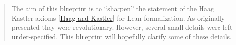 \begin{abstract}
The aim of this blueprint is to ``sharpen'' the statement of the Haag Kastler axioms [\href{https://doi.org/10.1063/1.1704187}{Haag and Kastler}] for Lean formalization. As originally presented they were revolutionary. However, several small details were left under-specified. This blueprint will hopefully clarify some of these details.
\end{abstract}
